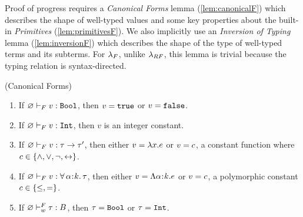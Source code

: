 \begin{fullversion}
%
Proof of progress requires a \emph{Canonical Forms} 
lemma (\cref{lem:canonicalF}) which describes the 
shape of well-typed values and some key properties 
about the built-in \emph{Primitives} (\cref{lem:primitivesF}).
%
We also implicitly use an \emph{Inversion of Typing} 
lemma (\cref{lem:inversionF}) which describes the shape of the 
type of well-typed terms and its subterms. For $\lambda_{F}$, 
unlike $\lambda_{RF}$, this lemma
is trivial because the typing relation is syntax-directed.

%

\begin{lemma}\label{lem:canonicalF} (Canonical Forms) 
\begin{enumerate}
    \item If ${\varnothing} \vdash_F {v} : {\texttt{Bool}}$, 
        then $v = \mathtt{true}$ or $v = \mathtt{false}$.
    \item If ${\varnothing} \vdash_F {v} : {\texttt{Int}}$, then $v$ is an integer constant.
    \item If ${\varnothing} \vdash_F {v} : {\tau \rightarrow \tau'}$, 
        then either $v = \lambda x. {e}$ or $v = c$, 
        a constant function where 
        $c \in \{\wedge, \vee, \neg, \leftrightarrow \}$.
    \item If ${\varnothing} \vdash_F {v} : {\forall\, \alpha\hspace{0.05em}{:}\hspace{0.05em} k.\, \tau}$, 
        then either $v = \Lambda{\alpha}\hspace{0.05em}{:}\hspace{0.05em}{\ensuremath{k}}.{e}$ 
        or $v = c$, a polymorphic constant $c \in \{\leq, =\}$.
    \item If ${\varnothing} \vdash_w^F {\tau} : {B}$,
        then $\tau = \texttt{Bool}$ or $\tau = \texttt{Int}$.
\end{enumerate}
\end{lemma}


\end{fullversion}

